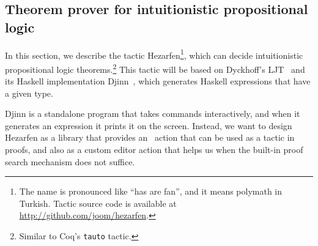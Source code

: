 \subsection{Theorem prover for intuitionistic propositional logic}\label{sec:hezarfen}

In this section, we describe the tactic Hezarfen\footnote{ The name is
  pronounced like ``has are fan'', and it means
    polymath in Turkish.  Tactic source code is available at
    \url{http://github.com/joom/hezarfen}.}, which can decide intuitionistic
propositional logic theorems.\footnote{Similar to Coq's \texttt{tauto} tactic.}
This tactic will be based on Dyckhoff's LJT~\cite{ljt} and its Haskell
implementation Djinn~\cite{djinn}, which generates Haskell expressions
that have a given type.

Djinn is a standalone program that takes commands
interactively, and when it generates an expression it prints it on the screen.
Instead, we want to design Hezarfen as a library that provides an \Elab\ action
that can be used as a tactic in proofs, and also as a custom editor action that
helps us when the built-in proof search mechanism does not suffice.







